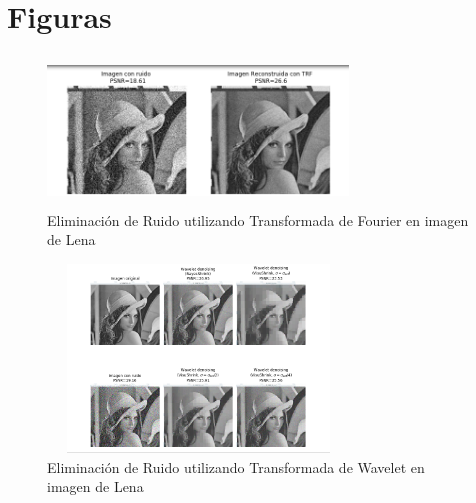 \documentclass[a4paper,10pt,twocolumn]{article}
\begin{document}
\newpage
\section{Figuras}\label{sub:figures}
	\begin{figure}[htb]%
	\begin{center}
	\includegraphics[width=8cm, height=4cm]{imagenes/Foto_4}
	\end{center}
	\caption{ Eliminaci\'{o}n de Ruido utilizando Transformada de Fourier en imagen de Lena\label{fig:fot_3}}%
	\end{figure}
		
	\begin{figure}[htb]%
	\begin{center}
	\includegraphics[width=8cm, height=5cm]{imagenes/Foto_5}
	\end{center}
	\caption{ Eliminaci\'{o}n de Ruido utilizando Transformada de Wavelet en imagen de Lena\label{fig:fot_4}}%
	\end{figure}
	
\end{document}
